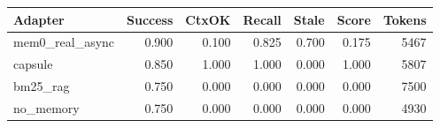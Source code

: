 \begin{tabular}{lrrrrrr}
\hline
Adapter & Success & CtxOK & Recall & Stale & Score & Tokens \\
\hline
mem0\_real\_async & 0.900 & 0.100 & 0.825 & 0.700 & 0.175 & 5467 \\
capsule & 0.850 & 1.000 & 1.000 & 0.000 & 1.000 & 5807 \\
bm25\_rag & 0.750 & 0.000 & 0.000 & 0.000 & 0.000 & 7500 \\
no\_memory & 0.750 & 0.000 & 0.000 & 0.000 & 0.000 & 4930 \\
\hline
\end{tabular}
